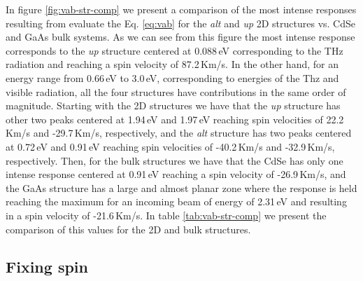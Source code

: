 \documentclass[prb,11pt,tightenlines,twocolumn,aps]{revtex4-1}
\begin{document}
In figure \ref{fig:vab-str-comp} we present a comparison of the most intense
responses resulting from evaluate the Eq. \eqref{eq:vab} for the \emph{alt} and
\emph{up} 2D structures vs. CdSe and GaAs bulk systems. As we can see from
this figure the most intense response corresponds to the \emph{up} structure
centered at 0.088\,eV corresponding to the THz radiation and reaching a
spin velocity of 87.2\,Km/s.
% 
In the other hand, for an energy range from 0.66\,eV to 3.0\,eV, corresponding
to energies of the Thz and visible radiation, all the four structures have
contributions in the same order of magnitude.
% 
Starting with the 2D structures we have that the \emph{up} structure has other
two peaks centered at 1.94\,eV and 1.97\,eV reaching spin velocities of
22.2\,Km/s and -29.7\,Km/s, respectively, and the \emph{alt} structure has two
peaks centered at 0.72\,eV and 0.91\,eV reaching spin velocities of -40.2\,Km/s
and -32.9\,Km/s, respectively.
% 
Then, for the bulk structures we have that the CdSe has only one intense
response centered at 0.91\,eV reaching a spin velocity of -26.9\,Km/s, and the
GaAs structure has a large and almost planar zone where the response is held
reaching the maximum for an incoming beam of energy of 2.31\,eV and resulting in
a spin velocity of -21.6\,Km/s.
% 
In table \ref{tab:vab-str-comp} we present the comparison of this values for the
2D and bulk structures.
% 




\subsection{Fixing spin} %
\label{sec:res-fixspin}


\end{document}
